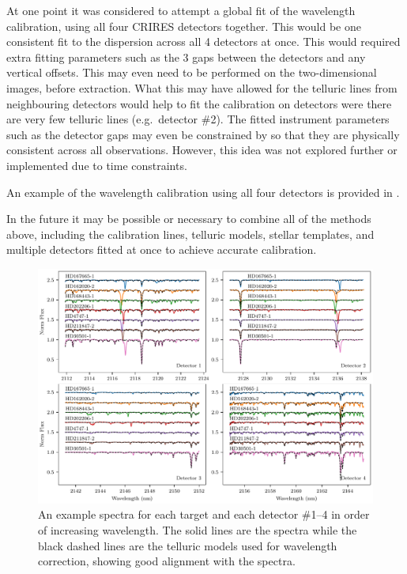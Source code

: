 


At one point it was considered to attempt a global fit of the wavelength calibration, using all four {CRIRES} detectors together. This would be one consistent fit to the dispersion across all 4 detectors at once. This would required extra fitting parameters such as the 3 gaps between the detectors and any vertical offsets. This may even need to be performed on the two-dimensional images, before extraction. What this may have allowed for the telluric lines from neighbouring detectors would help to fit the calibration on detectors were there are very few telluric lines (e.g.\ detector \#2). The fitted instrument parameters such as the detector gaps may even be constrained by so that they are physically consistent across all observations. However, this idea was not explored further or implemented due to time constraints.


An example of the wavelength calibration using all four detectors is provided in .

In the future it may be possible or necessary to combine all of the methods above, including the \thar{} calibration lines, telluric models, stellar templates, and multiple detectors fitted at once to achieve accurate calibration.

\begin{figure}
    \centering
    \includegraphics[width=1\linewidth]{figures/reduction/Spectra_examples}
    \caption{An example spectra for each target and each detector \#1--4 in order of increasing wavelength. The solid lines are the spectra while the black dashed lines are the telluric models used for wavelength correction, showing good alignment with the spectra.}
    \label{fig:spectraexamples}
\end{figure}


